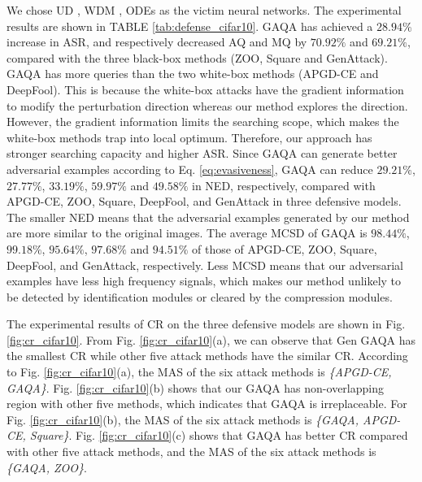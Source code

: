 \documentclass[lettersize,journal]{IEEEtran}
\begin{document}
	We chose UD \cite{carmon2022unlabeled}, WDM \cite{huang2022exploring}, ODEs \cite{kang2021stable} as the victim neural networks. The experimental results are shown in TABLE \ref{tab:defense_cifar10}. GAQA has achieved a $28.94\%$ increase in ASR, and respectively decreased AQ and MQ by $70.92\%$ and $69.21\%$, compared with the three black-box methods (ZOO, Square and GenAttack). GAQA has more queries than the two white-box methods (APGD-CE and DeepFool).
	This is because the white-box attacks have the gradient information to modify the perturbation direction whereas our method explores the direction. However, the gradient information limits the searching scope, which makes the white-box methods trap into local optimum. Therefore, our approach has stronger searching capacity and higher ASR.
	Since GAQA can generate better adversarial examples according to Eq. \ref{eq:evasiveness}, GAQA can reduce $29.21\%$, $27.77\%$, $33.19\%$, $59.97\%$ and $49.58\%$ in NED, respectively, compared with APGD-CE, ZOO, Square, DeepFool, and GenAttack in three defensive models. The smaller NED means that the adversarial examples generated by our method are more similar to the original images. The average MCSD of GAQA is $98.44\%$, $99.18\%$, $95.64\%$, $97.68\%$ and $94.51\%$
	of those of APGD-CE, ZOO, Square, DeepFool, and GenAttack, respectively. Less MCSD means that our adversarial examples have less high frequency signals, which makes our method unlikely to be detected by identification modules or cleared by the compression modules.
	
	
	The experimental results of CR on the three defensive models are shown in Fig. \ref{fig:cr_cifar10}. From Fig. \ref{fig:cr_cifar10}(a), we can observe that Gen GAQA has the smallest CR while other five attack methods have the similar CR. According to Fig. \ref{fig:cr_cifar10}(a), the MAS of the six attack methods is \emph{\{APGD-CE, GAQA\}}. Fig. \ref{fig:cr_cifar10}(b) shows that our GAQA has non-overlapping region with other five methods, which indicates that GAQA is irreplaceable.  For Fig. \ref{fig:cr_cifar10}(b), the MAS of the six attack methods is \emph{\{GAQA, APGD-CE, Square\}}. Fig. \ref{fig:cr_cifar10}(c) shows that GAQA has better CR compared with other five attack methods, and the MAS of the six attack methods is \emph{\{GAQA, ZOO\}}.
	
\end{document}
